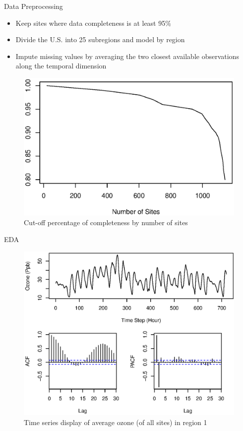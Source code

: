 \documentclass{beamer}
\begin{document}
\begin{frame}{Data Preprocessing}
\begin{itemize}
\item Keep sites where data completeness is at least 95\%
\item Divide the U.S. into 25 subregions and model by region
\item Impute missing values by averaging the two closest available observations along the temporal dimension
\end{itemize}
\begin{figure}
\centering
\includegraphics[scale = 0.3]{completeness_by_n_sites.eps}
\caption{Cut-off percentage of completeness by number of sites}
\end{figure}
\end{frame}

\begin{frame}{EDA}
\begin{figure}
\centering
\includegraphics[scale = 0.4]{ts_o3.eps}
\caption{Time series display of average ozone (of all sites) in region 1}
\end{figure}
\end{frame}
\end{document}
